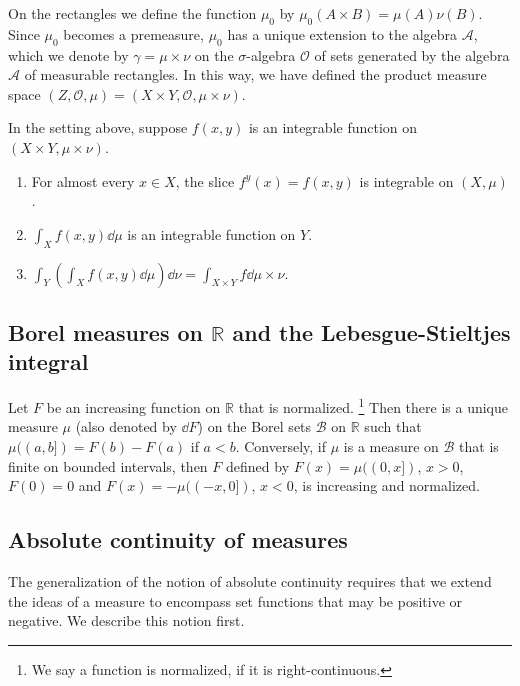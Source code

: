 On the rectangles we define the function $\mu_0$ by $\mu_0(A\times B) = \mu(A)\nu(B)$.
Since $\mu_0$ becomes a premeasure, $\mu_0$ has a unique extension to the algebra $\mathcal A$,
which we denote by $\gamma=\mu\times\nu$ on the $\sigma$-algebra $\mathcal O$ of sets generated by the algebra $\mathcal A$ of measurable rectangles.
In this way, we have defined the product measure space $(Z,\mathcal O,\mu) = (X\times Y,\mathcal O,\mu\times\nu)$.

\begin{theorem}
  In the setting above, suppose $f(x,y)$ is an integrable function on $(X\times Y,\mu\times\nu)$.
  \begin{enumerate}
    \item For almost every $x\in X$, the slice $f^y(x) = f(x,y)$ is integrable on $(X,\mu)$.
    \item $\int_Xf(x,y)\dd\mu$ is an integrable function on $Y$.
    \item $\int_Y\left(\int_Xf(x,y)\dd\mu\right)\dd\nu = \int_{X\times Y}f\dd\mu\times\nu$.
  \end{enumerate}
\end{theorem}

\subsection{Borel measures on \texorpdfstring{$\mathbb R$}{R} and the Lebesgue-Stieltjes integral}

\begin{theorem}
  Let $F$ be an increasing function on $\mathbb R$ that is normalized.
  \footnote{We say a function is normalized, if it is right-continuous.}
  Then there is a unique measure $\mu$ (also denoted by $\dd F$) on the Borel sets $\mathcal B$ on $\mathbb R$
  such that $\mu((a,b]) = F(b) - F(a)$ if $a<b$.
  Conversely, if $\mu$ is a measure on $\mathcal B$ that is finite on bounded intervals,
  then $F$ defined by $F(x) = \mu((0,x])$, $x>0$, $F(0) = 0$ and $F(x) = -\mu((-x,0])$, $x<0$, 
  is increasing and normalized.
\end{theorem}

\subsection{Absolute continuity of measures}

The generalization of the notion of absolute continuity requires that we extend the ideas of a measure to encompass set functions that may be positive or negative. 
We describe this notion first.

